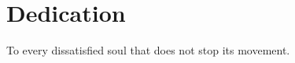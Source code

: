 \chapter*{Dedication}

\begin{center}
\vspace*{3cm}

To every dissatisfied soul that does not stop its movement.

\end{center}